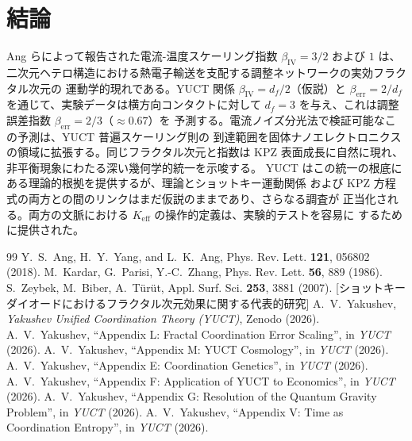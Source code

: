 \documentclass[12pt,a4paper]{article}
\newcommand{\Keff}{K_{\mathrm{eff}}}
\theoremstyle{remark}
\begin{document}
	\section{結論}
	Ang らによって報告された電流-温度スケーリング指数 $\beta_{\mathrm{IV}} = 3/2$ および $1$ は、
	二次元ヘテロ構造における熱電子輸送を支配する調整ネットワークの実効フラクタル次元の
	運動学的現れである。YUCT 関係 $\beta_{\mathrm{IV}} = d_f/2$（仮説）と
	$\beta_{\mathrm{err}} = 2/d_f$ を通じて、実験データは横方向コンタクトに対して
	$d_f = 3$ を与え、これは調整誤差指数 $\beta_{\mathrm{err}} = 2/3$（$\approx 0.67$）を
	予測する。電流ノイズ分光法で検証可能なこの予測は、YUCT 普遍スケーリング則の
	到達範囲を固体ナノエレクトロニクスの領域に拡張する。同じフラクタル次元と指数は
	KPZ 表面成長に自然に現れ、非平衡現象にわたる深い幾何学的統一を示唆する。
	YUCT はこの統一の根底にある理論的根拠を提供するが、理論とショットキー運動関係
	および KPZ 方程式の両方との間のリンクはまだ仮説のままであり、さらなる調査が
	正当化される。両方の文脈における $\Keff$ の操作的定義は、実験的テストを容易に
	するために提供された。
	
	\begin{thebibliography}{99}
		 Y.~S.~Ang, H.~Y.~Yang, and L.~K.~Ang,
		Phys. Rev. Lett. \textbf{121}, 056802 (2018).
		 M.~Kardar, G.~Parisi, Y.-C.~Zhang,
		Phys. Rev. Lett. \textbf{56}, 889 (1986).
		 S.~Zeybek, M.~Biber, A.~Türüt,
		Appl. Surf. Sci. \textbf{253}, 3881 (2007). [ショットキーダイオードにおけるフラクタル次元効果に関する代表的研究]
		 A.~V.~Yakushev, \emph{Yakushev Unified
			Coordination Theory (YUCT)}, Zenodo (2026).
		 A.~V.~Yakushev, ``Appendix L: Fractal
		Coordination Error Scaling'', in \emph{YUCT} (2026).
		 A.~V.~Yakushev, ``Appendix M: YUCT
		Cosmology'', in \emph{YUCT} (2026).
		 A.~V.~Yakushev, ``Appendix E: Coordination
		Genetics'', in \emph{YUCT} (2026).
		 A.~V.~Yakushev, ``Appendix F: Application of
		YUCT to Economics'', in \emph{YUCT} (2026).
		 A.~V.~Yakushev, ``Appendix G: Resolution of
		the Quantum Gravity Problem'', in \emph{YUCT} (2026).
		 A.~V.~Yakushev, ``Appendix V: Time as
		Coordination Entropy'', in \emph{YUCT} (2026).
	\end{thebibliography}
	
\end{document}
